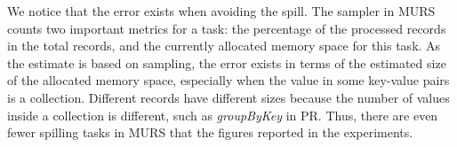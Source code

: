 We notice that the error exists when avoiding the spill. The sampler in MURS counts two important metrics for a task: the percentage of the processed records in the total records, and the currently allocated memory space for this task. 
As the estimate is based on sampling, the error exists in terms of the estimated size of the allocated memory space, especially when the value in some key-value pairs is a collection. Different records have different sizes because the number of values inside a collection is different, such as \textit{groupByKey} in PR. %
Thus, there are even fewer spilling tasks in MURS that the figures reported in the experiments.
